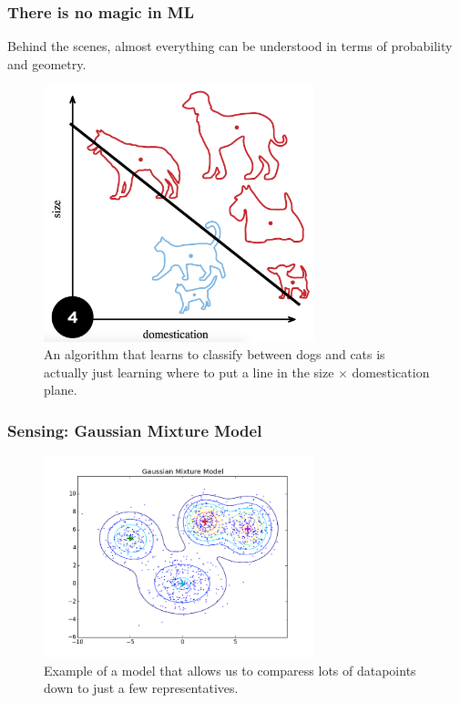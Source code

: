 \documentclass[10pt,mathserif]{beamer}
\begin{document}
\begin{frame}
  \frametitle{There is no magic in ML}
  Behind the scenes, almost everything can be understood in terms of probability
  and geometry.
  \begin{figure}[ht]
    \centering
    \includegraphics[width=0.7\textwidth]{figures/perceptron}
    \caption{An algorithm that learns to classify between dogs and cats is
      actually just learning where to put a line in the size $\times$
      domestication plane. \label{fig:perceptrong} }
  \end{figure}
\end{frame}

\begin{frame}
  \frametitle{Sensing: Gaussian Mixture Model}
 \begin{figure}[ht]
   \centering
   \includegraphics[width=0.7\textwidth]{figures/gmm}
   \caption{Example of a model that allows us to comparess lots of datapoints
     down to just a few representatives. \label{fig:gmm} }
 \end{figure}
\end{frame}
\end{document}
